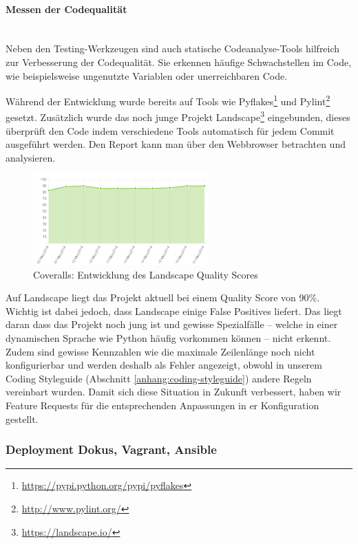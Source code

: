 \paragraph{Messen der Codequalität} \hspace{0pt} \\
Neben den Testing-Werkzeugen sind auch statische Codeanalyse-Tools hilfreich zur
Verbesserung der Codequalität. Sie erkennen häufige Schwachstellen im Code, wie
beispielsweise ungenutzte Variablen oder unerreichbaren Code.

Während der Entwicklung wurde bereits auf Tools wie
Pyflakes\footnote{\url{https://pypi.python.org/pypi/pyflakes}} und
Pylint\footnote{\url{http://www.pylint.org/}} gesetzt. Zusätzlich wurde das noch
junge Projekt Landscape\footnote{\url{https://landscape.io/}} eingebunden,
dieses überprüft den Code indem verschiedene Tools automatisch für jedem Commit
ausgeführt werden. Den Report kann man über den Webbrowser betrachten und
analysieren.

\begin{figure}[H]
	\centering
	\includegraphics[width=0.6\textwidth]{images/landscape}
	\caption{Coveralls: Entwicklung des Landscape Quality Scores}
	\label{improvements:landscape}
\end{figure}

Auf Landscape liegt das Projekt aktuell bei einem Quality Score von 90\%.
Wichtig ist dabei jedoch, dass Landscape einige False Positives liefert. Das
liegt daran dass das Projekt noch jung ist und gewisse Spezialfälle -- welche in
einer dynamischen Sprache wie Python häufig vorkommen können -- nicht erkennt.
Zudem sind gewisse Kennzahlen wie die maximale Zeilenlänge noch nicht
konfigurierbar und werden deshalb als Fehler angezeigt, obwohl in unserem Coding
Styleguide (Abschnitt \ref{anhang:coding-styleguide}) andere Regeln vereinbart
wurden. Damit sich diese Situation in Zukunft verbessert, haben wir Feature
Requests für die entsprechenden Anpassungen in er Konfiguration gestellt.


\subsubsection{Deployment Dokus, Vagrant, Ansible}

